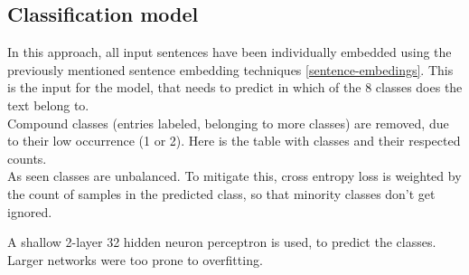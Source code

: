 \documentclass[fleqn,moreauthors,10pt]{ds_report}
\begin{document}
\begin{table}[h]
    \centering
    \caption{Cluster composition percentages using agglomerative clustering with embeddings from transformer all-mpnet-base-v2.}
    \label{tab:clusters_agglomerative}
    \end{table}


\subsection{Classification model}
In this approach, all input sentences have been individually embedded using the previously mentioned sentence embedding techniques \ref{sentence-embedings}. This is the input for the model, that needs to predict in which of the 8 classes does the text belong to. \\

Compound classes (entries labeled, belonging to more classes) are removed, due to their low occurrence (1 or 2). Here is the table with classes and their respected counts. \\




As seen classes are unbalanced. To mitigate this, cross entropy loss is weighted by the count of samples in the predicted class, so that minority classes don't get ignored.

A shallow 2-layer 32 hidden neuron perceptron is used, to predict the classes. Larger networks were too prone to overfitting.
\end{document}
